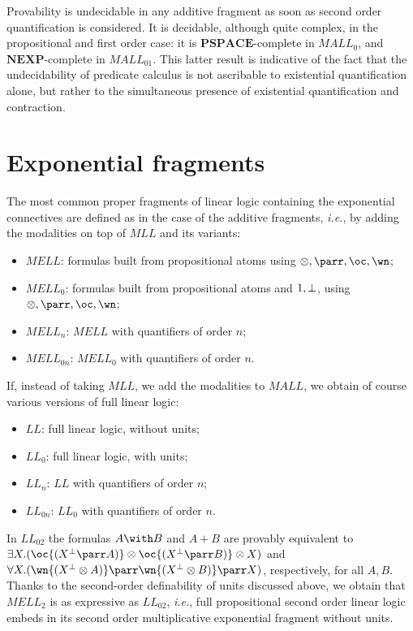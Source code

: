 Provability is undecidable in any additive fragment as soon as second
order quantification is considered. It is decidable, although quite
complex, in the propositional and first order case: it is
\(\mathbf{PSPACE}\)-complete in \(MALL_0\), and
\(\mathbf{NEXP}\)-complete in \(MALL_{01}\). This latter result is
indicative of the fact that the undecidability of predicate calculus is
not ascribable to existential quantification alone, but rather to the
simultaneous presence of existential quantification and contraction.

\section{Exponential fragments}\label{exponential-fragments}

The most common proper fragments of linear logic containing the
exponential connectives are defined as in the case of the additive
fragments, \emph{i.e.}, by adding the modalities on top of \(MLL\) and
its variants:
\begin{itemize}
\item
  \(MELL\): formulas built from propositional atoms using
  \(\tens,\parr,\oc,\wn\);
\item
  \(MELL_0\): formulas built from propositional atoms and \(1,\bot\),
  using \(\tens,\parr,\oc,\wn\);
\item
  \(MELL_n\): \(MELL\) with quantifiers of order \(n\);
\item
  \(MELL_{0n}\): \(MELL_0\) with quantifiers of order \(n\).
\end{itemize}

If, instead of taking \(MLL\), we add the modalities to \(MALL\), we
obtain of course various versions of full linear logic:
\begin{itemize}
\item
  \(LL\): full linear logic, without units;
\item
  \(LL_0\): full linear logic, with units;
\item
  \(LL_n\): \(LL\) with quantifiers of order \(n\);
\item
  \(LL_{0n}\): \(LL_0\) with quantifiers of order \(n\).
\end{itemize}

In \(LL_{02}\) the formulas \(A\with B\) and \(A\plus B\) are provably
equivalent to
\(\exists X.(\oc{(X\orth\parr A)}\tens\oc{(X\orth\parr B)}\tens X)\) and
\(\forall X.(\wn{(X\orth\tens A)}\parr\wn{(X\orth \tens B)}\parr X)\),
respectively, for all \(A,B\). Thanks to the second-order definability
of units discussed above, we obtain that \(MELL_2\) is as expressive as
\(LL_{02}\), \emph{i.e.}, full propositional second order linear logic
embeds in its second order multiplicative exponential fragment without
units.

